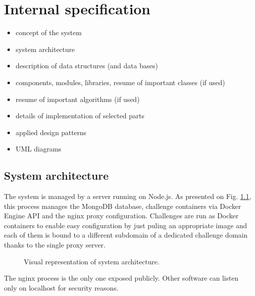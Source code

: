 \chapter{Internal specification}

\begin{itemize}
\item concept of the system
\item system architecture
\item description of data structures (and data bases)
\item components, modules, libraries, resume of important classes (if used)
\item resume of important algorithms (if used)
\item details of implementation of selected parts
\item applied design patterns
\item UML diagrams
\end{itemize}


\section{System architecture}

The system is managed by a server running on Node.js. As presented on Fig. \ref{fig:system-architecture}, this process manages the MongoDB database, challenge containers via Docker Engine API and the nginx proxy configuration. Challenges are run as Docker containers to enable easy configuration by just puling an appropriate image and each of them is bound to a different subdomain of a dedicated challenge domain thanks to the single proxy server.

\begin{figure}
    \centering
    
    \caption{Visual representation of system architecture.}
    \label{fig:system-architecture}
\end{figure}

The nginx process is the only one exposed publicly. Other software can listen only on localhost for security reasons.

